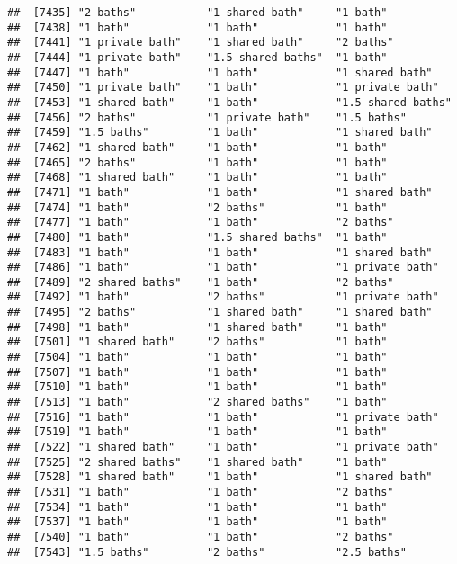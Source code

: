 \documentclass[
]{article}
\begin{document}
\begin{verbatim}
##  [7435] "2 baths"           "1 shared bath"     "1 bath"           
##  [7438] "1 bath"            "1 bath"            "1 bath"           
##  [7441] "1 private bath"    "1 shared bath"     "2 baths"          
##  [7444] "1 private bath"    "1.5 shared baths"  "1 bath"           
##  [7447] "1 bath"            "1 bath"            "1 shared bath"    
##  [7450] "1 private bath"    "1 bath"            "1 private bath"   
##  [7453] "1 shared bath"     "1 bath"            "1.5 shared baths" 
##  [7456] "2 baths"           "1 private bath"    "1.5 baths"        
##  [7459] "1.5 baths"         "1 bath"            "1 shared bath"    
##  [7462] "1 shared bath"     "1 bath"            "1 bath"           
##  [7465] "2 baths"           "1 bath"            "1 bath"           
##  [7468] "1 shared bath"     "1 bath"            "1 bath"           
##  [7471] "1 bath"            "1 bath"            "1 shared bath"    
##  [7474] "1 bath"            "2 baths"           "1 bath"           
##  [7477] "1 bath"            "1 bath"            "2 baths"          
##  [7480] "1 bath"            "1.5 shared baths"  "1 bath"           
##  [7483] "1 bath"            "1 bath"            "1 shared bath"    
##  [7486] "1 bath"            "1 bath"            "1 private bath"   
##  [7489] "2 shared baths"    "1 bath"            "2 baths"          
##  [7492] "1 bath"            "2 baths"           "1 private bath"   
##  [7495] "2 baths"           "1 shared bath"     "1 shared bath"    
##  [7498] "1 bath"            "1 shared bath"     "1 bath"           
##  [7501] "1 shared bath"     "2 baths"           "1 bath"           
##  [7504] "1 bath"            "1 bath"            "1 bath"           
##  [7507] "1 bath"            "1 bath"            "1 bath"           
##  [7510] "1 bath"            "1 bath"            "1 bath"           
##  [7513] "1 bath"            "2 shared baths"    "1 bath"           
##  [7516] "1 bath"            "1 bath"            "1 private bath"   
##  [7519] "1 bath"            "1 bath"            "1 bath"           
##  [7522] "1 shared bath"     "1 bath"            "1 private bath"   
##  [7525] "2 shared baths"    "1 shared bath"     "1 bath"           
##  [7528] "1 shared bath"     "1 bath"            "1 shared bath"    
##  [7531] "1 bath"            "1 bath"            "2 baths"          
##  [7534] "1 bath"            "1 bath"            "1 bath"           
##  [7537] "1 bath"            "1 bath"            "1 bath"           
##  [7540] "1 bath"            "1 bath"            "2 baths"          
##  [7543] "1.5 baths"         "2 baths"           "2.5 baths"        

\end{verbatim}
\end{document}
